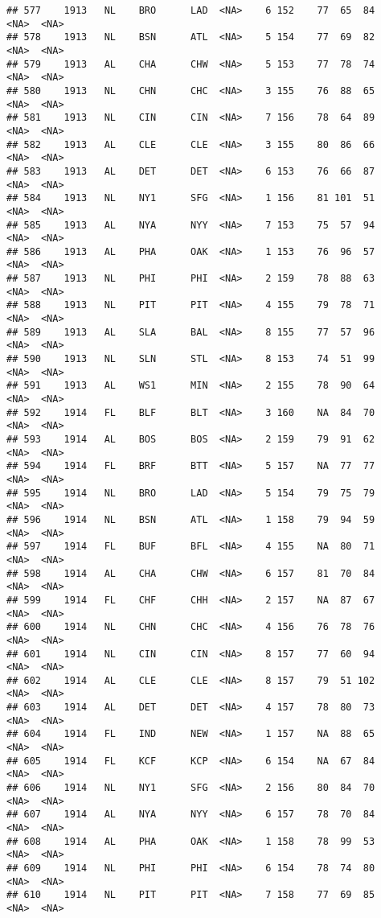 \documentclass[]{article}
\begin{document}
\begin{verbatim}
## 577    1913   NL    BRO      LAD  <NA>    6 152    77  65  84   <NA>  <NA>
## 578    1913   NL    BSN      ATL  <NA>    5 154    77  69  82   <NA>  <NA>
## 579    1913   AL    CHA      CHW  <NA>    5 153    77  78  74   <NA>  <NA>
## 580    1913   NL    CHN      CHC  <NA>    3 155    76  88  65   <NA>  <NA>
## 581    1913   NL    CIN      CIN  <NA>    7 156    78  64  89   <NA>  <NA>
## 582    1913   AL    CLE      CLE  <NA>    3 155    80  86  66   <NA>  <NA>
## 583    1913   AL    DET      DET  <NA>    6 153    76  66  87   <NA>  <NA>
## 584    1913   NL    NY1      SFG  <NA>    1 156    81 101  51   <NA>  <NA>
## 585    1913   AL    NYA      NYY  <NA>    7 153    75  57  94   <NA>  <NA>
## 586    1913   AL    PHA      OAK  <NA>    1 153    76  96  57   <NA>  <NA>
## 587    1913   NL    PHI      PHI  <NA>    2 159    78  88  63   <NA>  <NA>
## 588    1913   NL    PIT      PIT  <NA>    4 155    79  78  71   <NA>  <NA>
## 589    1913   AL    SLA      BAL  <NA>    8 155    77  57  96   <NA>  <NA>
## 590    1913   NL    SLN      STL  <NA>    8 153    74  51  99   <NA>  <NA>
## 591    1913   AL    WS1      MIN  <NA>    2 155    78  90  64   <NA>  <NA>
## 592    1914   FL    BLF      BLT  <NA>    3 160    NA  84  70   <NA>  <NA>
## 593    1914   AL    BOS      BOS  <NA>    2 159    79  91  62   <NA>  <NA>
## 594    1914   FL    BRF      BTT  <NA>    5 157    NA  77  77   <NA>  <NA>
## 595    1914   NL    BRO      LAD  <NA>    5 154    79  75  79   <NA>  <NA>
## 596    1914   NL    BSN      ATL  <NA>    1 158    79  94  59   <NA>  <NA>
## 597    1914   FL    BUF      BFL  <NA>    4 155    NA  80  71   <NA>  <NA>
## 598    1914   AL    CHA      CHW  <NA>    6 157    81  70  84   <NA>  <NA>
## 599    1914   FL    CHF      CHH  <NA>    2 157    NA  87  67   <NA>  <NA>
## 600    1914   NL    CHN      CHC  <NA>    4 156    76  78  76   <NA>  <NA>
## 601    1914   NL    CIN      CIN  <NA>    8 157    77  60  94   <NA>  <NA>
## 602    1914   AL    CLE      CLE  <NA>    8 157    79  51 102   <NA>  <NA>
## 603    1914   AL    DET      DET  <NA>    4 157    78  80  73   <NA>  <NA>
## 604    1914   FL    IND      NEW  <NA>    1 157    NA  88  65   <NA>  <NA>
## 605    1914   FL    KCF      KCP  <NA>    6 154    NA  67  84   <NA>  <NA>
## 606    1914   NL    NY1      SFG  <NA>    2 156    80  84  70   <NA>  <NA>
## 607    1914   AL    NYA      NYY  <NA>    6 157    78  70  84   <NA>  <NA>
## 608    1914   AL    PHA      OAK  <NA>    1 158    78  99  53   <NA>  <NA>
## 609    1914   NL    PHI      PHI  <NA>    6 154    78  74  80   <NA>  <NA>
## 610    1914   NL    PIT      PIT  <NA>    7 158    77  69  85   <NA>  <NA>

\end{verbatim}
\end{document}
